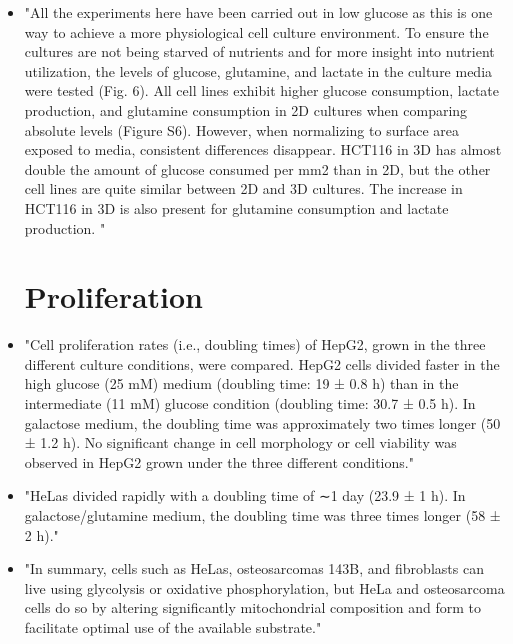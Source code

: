 \documentclass[11pt,a4paper]{article}
\begin{document}
\begin{itemize}
\item "All the experiments here have been carried out in low glucose as this is one way to achieve a more physiological cell culture environment. To ensure the cultures are not being starved of nutrients and for more insight into nutrient utilization, the levels of glucose, glutamine, and lactate in the culture media were tested (Fig. 6). All cell lines exhibit higher glucose consumption, lactate production, and glutamine consumption in 2D cultures when comparing absolute levels (Figure S6). However, when normalizing to surface area exposed to media, consistent differences disappear. HCT116 in 3D has almost double the amount of glucose consumed per mm2 than in 2D, but the other cell lines are quite similar between 2D and 3D cultures. The increase in HCT116 in 3D is also present for glutamine consumption and lactate production. "\cite{Tidwell2022}

\section{Proliferation}
\item "Cell proliferation rates (i.e., doubling times) of HepG2, grown in the three different culture conditions, were compared. HepG2 cells divided faster in the high glucose (25 mM) medium (doubling time: 19 ± 0.8 h) than in the intermediate (11 mM) glucose condition (doubling time: 30.7 ± 0.5 h). In galactose medium, the doubling time was approximately two times longer (50 ± 1.2 h). No significant change in cell morphology or cell viability was observed in HepG2 grown under the three different conditions."\cite{Domenis2012}

\item "HeLas divided rapidly with a doubling time of ∼1 day (23.9 ± 1 h). In galactose/glutamine medium, the doubling time was three times longer (58 ± 2 h)."\cite{Rossignol2004}

\item "In summary, cells such as HeLas, osteosarcomas 143B, and fibroblasts can live using glycolysis or oxidative phosphorylation, but HeLa and osteosarcoma cells do so by altering significantly mitochondrial composition and form to facilitate optimal use of the available substrate."\cite{Rossignol2004}


\end{itemize}
\end{document}
